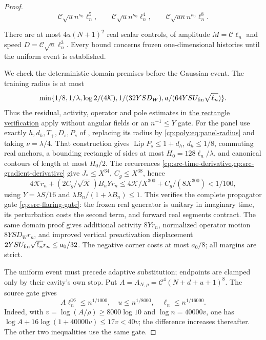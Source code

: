 \begin{proof}
\begin{equation}
\mathcal C\sqrt u n^{\kappa_0}\ell_n^5,\qquad
\mathcal C\sqrt u n^{\kappa_0}\ell_n^4,\qquad
\mathcal C\sqrt{un}n^{\kappa_0}\ell_n^8.
\label{cp:poly:eq:map-interface}
\end{equation}

There are at most $4u(N+1)^2$ real scalar controls, of amplitude
$M=\mathcal C\ell_n$ and speed $D=\mathcal C\sqrt n\ell_n^3$.
Every bound concerns frozen one-dimensional histories until the uniform
event is established.

We check the deterministic domain premises before the Gaussian event.
The training radius is at most
\[
\min\{1/8,1/\lambda,\log2/(4\mathcal K),1/(32YSD_W),
                a/(64YSU_{\rm fin}\sqrt{\ell_n})\}.
\]
Thus the residual, activity, operator and pole estimates in
\hyperref[cp:src-whole-sphere-verification]{the rectangle verification}
apply without angular fields or an $n^{-1}\le Y$ gate.
For the panel use exactly $h,d_h,T_+,D_s,P_s$ of
, replacing its radius by
\eqref{cp:poly:eq:panel-radius} and taking $\nu=\lambda/4$.
That construction gives $\operatorname{Lip}P_s\le1+d_h$,
$d_h\le1/8$, commuting real anchors, a bounding rectangle of sides
at most $H_0=128\ell_n/\lambda$, and canonical contours of length
at most $H_0/2$. The recurrences
\cref{cp:src-time-derivative,cp:src-gradient-derivative} give
$J_*\le X^{34}$, $C_g\le X^{38}$, hence
\[
4\mathcal Kr_n+(2C_g/\sqrt{\mathcal K})B_nYr_n
 \le4\mathcal K/X^{300}+C_g/(8X^{300})<1/100,
\]
using $Y=\lambda S/16$ and $\lambda B_n/(1+\lambda B_n)\le1$.
This verifies the complete propagator gate
\eqref{cp:src-flaring-gate}: the frozen real generator is unitary
in imaginary time, its perturbation costs the second term, and forward
real segments contract. The same domain proof gives additional activity
$8Yr_n$, normalized operator motion $8YSD_Wr_n$, and improved
vertical preactivation displacement
$2YSU_{\rm fin}\sqrt{\ell_n}r_n\le a_0/32$.
The negative corner costs at most $a_0/8$; all margins are strict.

The uniform event must precede adaptive substitution; endpoints are
clamped only by their cavity's own stop. Put
$A=A_{N,\rho}=\mathcal C^4(N+d+u+1)^8$. The source gate gives
\begin{equation}
A\ell_n^{16}\le n^{1/1000},\quad
u\le n^{1/8000},\quad \ell_n\le n^{1/16000}.
\label{cp:poly:eq:absorption-gates}
\end{equation}
Indeed, with $v=\log(A/\rho)\ge8000\log10$ and
$\log n=40000v$, one has
$\log A+16\log(1+40000v)\le17v<40v$; the difference increases
thereafter. The other two inequalities use the same gate.


\end{proof}
